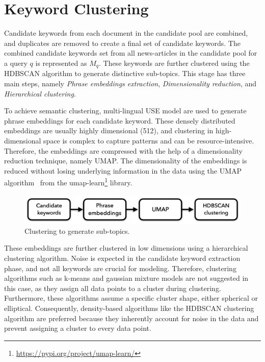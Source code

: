 \section{Keyword Clustering}

Candidate keywords from each document in the candidate pool are combined, and duplicates are removed to create a final set of candidate keywords. The combined candidate keywords set from all news-articles in the candidate pool for a query $q$ is represented as $M_q$. These keywords are further clustered using the \ac{HDBSCAN} algorithm to generate distinctive sub-topics. This stage has three main steps, namely \emph{Phrase embeddings extraction}, \emph{Dimensionality reduction}, and \emph{Hierarchical clustering}. 

To achieve semantic clustering, multi-lingual \ac{USE} model are used to generate phrase embeddings for each candidate keyword. These densely distributed embeddings are usually highly dimensional (512), and clustering in high-dimensional space is complex to capture patterns and can be resource-intensive. Therefore, the embeddings are compressed with the help of a dimensionality reduction technique, namely \ac{UMAP}. The dimensionality of the embeddings is reduced without losing underlying information in the data using the \ac{UMAP} algorithm~\cite{mcinnes2018umap} from the umap-learn\footnote{\url{https://pypi.org/project/umap-learn/}} library.

\begin{figure}[h]
	\centering
	\includegraphics[width=.9\textwidth]{images/thesis_images/clustering.png}
	\caption{Clustering to generate sub-topics.  \label{fig:clustering}}
\end{figure}

 
These embeddings are further clustered in low dimensions using a hierarchical clustering algorithm. Noise is expected in the candidate keyword extraction phase, and not all keywords are crucial for modeling. Therefore, clustering algorithms such as k-means and gaussian mixture models are not suggested in this case, as they assign all data points to a cluster during clustering. Furthermore, these algorithms assume a specific cluster shape, either spherical or elliptical. Consequently, density-based algorithms like the \ac{HDBSCAN} clustering algorithm are preferred because they inherently account for noise in the data and prevent assigning a cluster to every data point.

